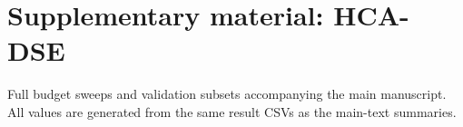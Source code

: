 \documentclass[preprint,11pt,3p]{elsarticle}
\begin{document}
\section*{Supplementary material: HCA-DSE}
Full budget sweeps and validation subsets accompanying the main manuscript.
All values are generated from the same result CSVs as the main-text summaries.
\begin{table}[!htbp]\centering
\caption{Full budget-matched comparison on S2. Medians over 20 seeds.}

\end{table}
\clearpage
\begin{table}[!htbp]\centering
\caption{Full budget-matched comparison on S3. Medians over 20 seeds.}

\end{table}
\clearpage
\begin{table}[!htbp]\centering
\caption{Full S3 statistical comparison: one-sided Mann--Whitney test for larger NSGA-II hypervolume and Cliff's $\delta$. Unadjusted $p$-values.}

\end{table}
\begin{table}[!htbp]\centering
\caption{Testbed validation against measured $p_{50}$, including utilisation and reproducibility subsets. Pair agreement is a fraction; undefined values (no eligible pairs) are shown as --.}

\end{table}
\clearpage
\begin{table}[!htbp]\centering
\caption{Full order/queue ablation on S1--S3. All configurations preserve the unrounded exhaustive front.}

\end{table}
\end{document}
